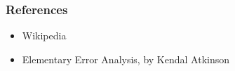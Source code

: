 \documentclass{beamer}
\begin{document}
\begin{frame}
    \frametitle{References}
    \begin{itemize}
        \item Wikipedia
        \item Elementary Error Analysis, by Kendal Atkinson
        
    \end{itemize}
\end{frame}
\end{document}
